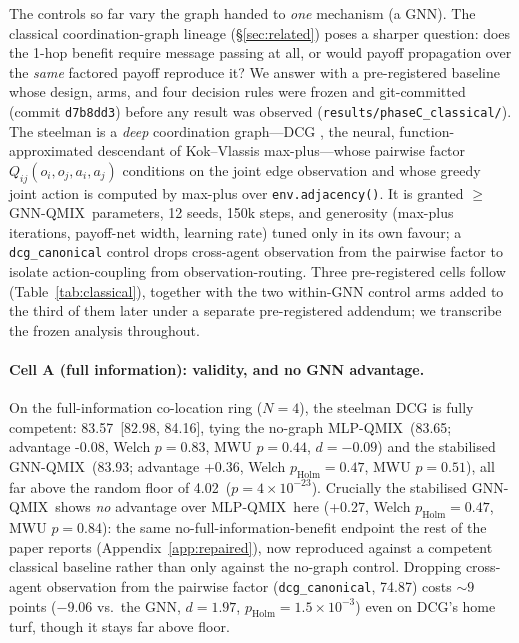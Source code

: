 \documentclass[10pt]{article}
\newcommand{\algoname}[1]{\textsc{#1}}
\newcommand{\gnnqmix}{\algoname{GNN-QMIX}}
\newcommand{\mlpqmix}{\algoname{MLP-QMIX}}
\newcommand{\CBAfloor}{4.02}
\newcommand{\CBAgnn}{83.93}            %
\newcommand{\CBAmlp}{83.65}            %
\newcommand{\CBAdcg}{83.57}            %
\newcommand{\CBAdcgCI}{[82.98, 84.16]}
\newcommand{\CBAcanon}{74.87}          %
\newcommand{\CBAgnnMlpGap}{+0.27}      %
\newcommand{\CBAgnnDcgGap}{+0.36}      %
\newcommand{\CBAdcgMlpGap}{-0.08}      %
\newcommand{\CBAcanonGnnGap}{-9.06}    %
\begin{document}
The controls so far vary the graph handed to \emph{one} mechanism (a GNN). The
classical coordination-graph lineage (\S\ref{sec:related}) poses a sharper
question: does the 1-hop benefit require message passing at all, or would
payoff propagation over the \emph{same} factored payoff reproduce it? We answer
with a pre-registered baseline whose design, arms, and four decision rules were
frozen and git-committed (commit \texttt{d7b8dd3}) before any result was
observed (\texttt{results/phaseC\_classical/}). The steelman is a \emph{deep}
coordination graph---\algoname{DCG} \citep{boehmer_2020_dcg}, the neural,
function-approximated descendant of Kok--Vlassis max-plus---whose pairwise
factor $Q_{ij}(o_i,o_j,a_i,a_j)$ conditions on the joint edge observation and
whose greedy joint action is computed by max-plus over
\texttt{env.adjacency()}. It is granted $\ge$ \gnnqmix\ parameters, 12 seeds,
150k steps, and generosity (max-plus iterations, payoff-net width, learning
rate) tuned only in its own favour; a \texttt{dcg\_canonical} control drops
cross-agent observation from the pairwise factor to isolate action-coupling
from observation-routing. Three pre-registered cells follow
(Table~\ref{tab:classical}), together with the two within-GNN control arms
added to the third of them later under a separate pre-registered addendum; we
transcribe the frozen analysis throughout.

\paragraph{Cell A (full information): validity, and no GNN advantage.} On the
full-information co-location ring ($N{=}4$), the steelman DCG is fully
competent: \CBAdcg\ \CBAdcgCI, tying the no-graph \mlpqmix\ (\CBAmlp; advantage
\CBAdcgMlpGap, Welch $p{=}0.83$, MWU $p{=}0.44$, $d{=}{-}0.09$) and the
stabilised \gnnqmix\ (\CBAgnn; advantage \CBAgnnDcgGap, Welch
$p_{\text{Holm}}{=}0.47$, MWU $p{=}0.51$), all far above the random floor of
\CBAfloor\ ($p{=}4{\times}10^{-23}$). Crucially the stabilised \gnnqmix\ shows
\emph{no} advantage over \mlpqmix\ here (\CBAgnnMlpGap, Welch
$p_{\text{Holm}}{=}0.47$, MWU $p{=}0.84$): the same no-full-information-benefit
endpoint the rest of the paper reports (Appendix~\ref{app:repaired}), now
reproduced against a competent classical baseline rather than only against the
no-graph control. Dropping cross-agent observation from the pairwise factor
(\texttt{dcg\_canonical}, \CBAcanon) costs ${\sim}9$ points ($\CBAcanonGnnGap$
vs.\ the GNN, $d{=}1.97$, $p_{\text{Holm}}{=}1.5{\times}10^{-3}$) even on DCG's
home turf, though it stays far above floor.
\end{document}
